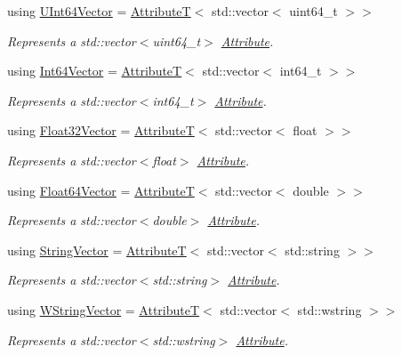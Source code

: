 \begin{DoxyCompactItemize}
using \hyperlink{group___process_attributes_gadd8cc39f67641bf2224cce7f27747c4f}{U\+Int64\+Vector} = \hyperlink{structdg_1_1deepcore_1_1_attribute_t}{AttributeT}$<$ std\+::vector$<$ uint64\+\_\+t $>$$>$
\begin{DoxyCompactList}\small\item\em Represents a {\ttfamily std\+::vector$<$uint64\+\_\+t$>$} \hyperlink{classdg_1_1deepcore_1_1_attribute}{Attribute}. \end{DoxyCompactList}\item 
using \hyperlink{group___process_attributes_gaef3a74f1d9d18b13bc1fac094487f68a}{Int64\+Vector} = \hyperlink{structdg_1_1deepcore_1_1_attribute_t}{AttributeT}$<$ std\+::vector$<$ int64\+\_\+t $>$$>$
\begin{DoxyCompactList}\small\item\em Represents a {\ttfamily std\+::vector$<$int64\+\_\+t$>$} \hyperlink{classdg_1_1deepcore_1_1_attribute}{Attribute}. \end{DoxyCompactList}\item 
using \hyperlink{group___process_attributes_ga79d0a6a07b8df1271460f9f6dd57ce57}{Float32\+Vector} = \hyperlink{structdg_1_1deepcore_1_1_attribute_t}{AttributeT}$<$ std\+::vector$<$ float $>$$>$
\begin{DoxyCompactList}\small\item\em Represents a {\ttfamily std\+::vector$<$float$>$} \hyperlink{classdg_1_1deepcore_1_1_attribute}{Attribute}. \end{DoxyCompactList}\item 
using \hyperlink{group___process_attributes_ga3b16885b09409d3555584c47d6fc4964}{Float64\+Vector} = \hyperlink{structdg_1_1deepcore_1_1_attribute_t}{AttributeT}$<$ std\+::vector$<$ double $>$$>$
\begin{DoxyCompactList}\small\item\em Represents a {\ttfamily std\+::vector$<$double$>$} \hyperlink{classdg_1_1deepcore_1_1_attribute}{Attribute}. \end{DoxyCompactList}\item 
using \hyperlink{group___process_attributes_gad54faaab3e92e81d2736c59cdef478a1}{String\+Vector} = \hyperlink{structdg_1_1deepcore_1_1_attribute_t}{AttributeT}$<$ std\+::vector$<$ std\+::string $>$$>$
\begin{DoxyCompactList}\small\item\em Represents a {\ttfamily std\+::vector$<$std\+::string$>$} \hyperlink{classdg_1_1deepcore_1_1_attribute}{Attribute}. \end{DoxyCompactList}\item 
using \hyperlink{group___process_attributes_gad1c4369cb66531cd432b69cbdb9ea527}{W\+String\+Vector} = \hyperlink{structdg_1_1deepcore_1_1_attribute_t}{AttributeT}$<$ std\+::vector$<$ std\+::wstring $>$$>$
\begin{DoxyCompactList}\small\item\em Represents a {\ttfamily std\+::vector$<$std\+::wstring$>$} \hyperlink{classdg_1_1deepcore_1_1_attribute}{Attribute}. \end{DoxyCompactList}\end{DoxyCompactItemize}

